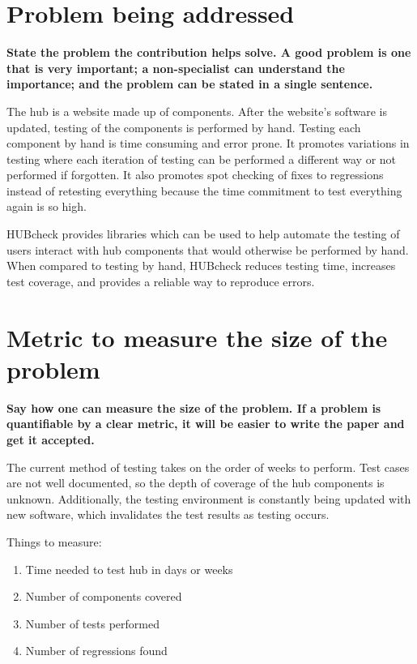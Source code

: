\documentclass[letterpaper]{article}
\begin{document}
\section{Problem being addressed}

\textbf{
State the problem the contribution helps solve. A good problem is one that is
very important; a non-specialist can understand the importance; and the problem
can be stated in a single sentence.
}

The hub is a website made up of components. After the website's software is
updated, testing of the components is performed by hand. Testing each component
by hand is time consuming and error prone.  It promotes variations in testing
where each iteration of testing can be performed a different way or not
performed if forgotten. It also promotes spot checking of fixes to regressions
instead of retesting everything because the time commitment to test everything
again is so high.

HUBcheck provides libraries which can be used to help automate the testing of
users interact with hub components that would otherwise be performed by hand.
When compared to testing by hand, HUBcheck reduces testing time, increases test
coverage, and provides a reliable way to reproduce errors.

\section{Metric to measure the size of the problem}

\textbf{
Say how one can measure the size of the problem. If a problem is quantifiable
by a clear metric, it will be easier to write the paper and get it accepted.
}


The current method of testing takes on the order of weeks to perform. Test
cases are not well documented, so the depth of coverage of the hub components
is unknown. Additionally, the testing environment is constantly being updated
with new software, which invalidates the test results as testing occurs.

Things to measure:

\begin{enumerate}
\item Time needed to test hub in days or weeks
\item Number of components covered
\item Number of tests performed
\item Number of regressions found
\end{enumerate}
\end{document}
